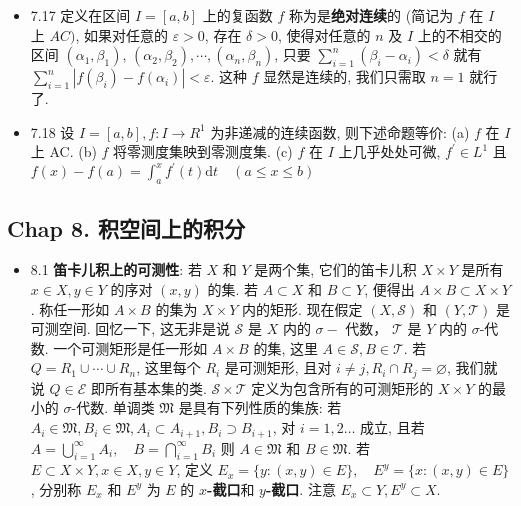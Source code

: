 \begin{itemize}
\item 7.17 定义在区间 $I=[a, b]$ 上的复函数 $f$ 称为是\textbf{绝对连续}的 (简记为 $f$ 在 $I$ 上 $A C)$, 如果对任意的 $\varepsilon>0$, 存在 $\delta>0$, 使得对任意的 $n$ 及 $I$ 上的不相交的区间 $\left(\alpha_{1}, \beta_{1}\right)$, $\left(\alpha_{2}, \beta_{2}\right), \cdots,\left(\alpha_{n}, \beta_{n}\right)$, 只要 $\sum_{i=1}^{n}\left(\beta_{i}-\alpha_{i}\right)<\delta$ 就有 $\sum_{i=1}^{n}\left|f\left(\beta_{i}\right)-f\left(\alpha_{i}\right)\right|<\varepsilon$. 这种 $f$ 显然是连续的, 我们只需取 $n=1$ 就行了.

\item 7.18 设 $I=[a, b], f: I \rightarrow R^{1}$ 为非递减的连续函数, 则下述命题等价: (a) $f$ 在 $I$ 上 AC. (b) $f$ 将零测度集映到零测度集. (c) $f$ 在 $I$ 上几乎处处可微, $f^{\prime} \in L^{1}$ 且 $f(x)-f(a)=\int_{a}^{x} f^{\prime}(t) \mathrm{d} t \quad(a \leqslant x \leqslant b)$
\end{itemize}

\subsection{Chap 8. 积空间上的积分}

\begin{itemize}
\item 8.1 \textbf{笛卡儿积上的可测性}: 若 $X$ 和 $Y$ 是两个集, 它们的笛卡儿积 $X \times Y$ 是所有 $x \in X, y \in Y$ 的序对 $(x, y)$ 的集. 若 $A \subset X$ 和 $B \subset Y$, 便得出 $A \times B \subset X \times Y$. 称任一形如 $A \times B$ 的集为 $X \times Y$ 内的矩形. 现在假定 $(X, \mathscr{S})$ 和 $(Y, \mathscr{T})$ 是可测空间. 回忆一下, 这无非是说 $\mathscr{S}$ 是 $X$ 内的 $\sigma-$ 代数， $\mathscr{T}$ 是 $Y$ 内的 $\sigma$-代数.
一个可测矩形是任一形如 $A \times B$ 的集, 这里 $A \in \mathscr{S}, B \in \mathscr{T}$.
若 $Q=R_{1} \cup \cdots \cup R_{n}$, 这里每个 $R_{i}$ 是可测矩形, 且对 $i \neq j, R_{i} \cap R_{j}=\varnothing$, 我们就说 $Q \in \mathscr{E}$ 即所有基本集的类. $\mathscr{S} \times \mathscr{T}$ 定义为包含所有的可测矩形的 $X \times Y$ 的最小的 $\sigma$-代数. 单调类 $\mathfrak{M}$ 是具有下列性质的集族: 若 $A_{i} \in \mathfrak{M}, B_{i} \in \mathfrak{M}, A_{i} \subset A_{i+1}, B_{i} \supset B_{i+1}$, 对 $i=1,2\dots$ 成立, 且若 $A=\bigcup_{i=1}^{\infty} A_{i}, \quad B=\bigcap_{i=1}^{\infty} B_{i}$ 则 $A \in \mathfrak{M}$ 和 $B \in \mathfrak{M}$. 若 $E \subset X \times Y, x \in X, y \in Y$, 定义 $E_{x}=\{y:(x, y) \in E\}, \quad E^{y}=\{x:(x, y) \in E\}$, 分别称 $E_{x}$ 和 $E^{y}$ 为 $E$ 的 \textbf{$x$-截口}和 \textbf{$y$-截口}. 注意 $E_{x} \subset Y, E^{y} \subset X$.
\end{itemize}

